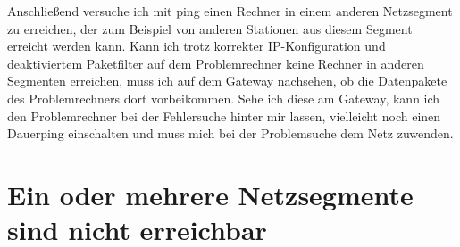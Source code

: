 \begin{normaltext}
Anschließend versuche ich mit ping einen Rechner in einem anderen
Netzsegment zu erreichen, der zum Beispiel von anderen Stationen
aus diesem Segment erreicht werden kann. Kann ich trotz korrekter
IP-Konfiguration und deaktiviertem Paketfilter auf dem Problemrechner keine
Rechner in anderen Segmenten erreichen, muss ich auf dem Gateway nachsehen, ob
die Datenpakete des Problemrechners dort vorbeikommen. Sehe ich diese am
Gateway, kann ich den Problemrechner bei der Fehlersuche hinter mir lassen,
vielleicht noch einen Dauerping einschalten und muss mich bei der Problemsuche
dem Netz zuwenden.

\end{normaltext}




\section{Ein oder mehrere Netzsegmente sind nicht erreichbar}
\label{sec:ausfall-netzsegment}

